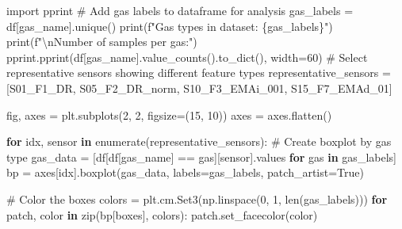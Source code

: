 \documentclass[
  letterpaper,
  DIV=11,
  numbers=noendperiod]{scrartcl}
\newenvironment{Shaded}{\begin{snugshade}}{\end{snugshade}}
\newcommand{\BuiltInTok}[1]{\textcolor[rgb]{0.00,0.23,0.31}{#1}}
\newcommand{\CharTok}[1]{\textcolor[rgb]{0.13,0.47,0.30}{#1}}
\newcommand{\CommentTok}[1]{\textcolor[rgb]{0.37,0.37,0.37}{#1}}
\newcommand{\ControlFlowTok}[1]{\textcolor[rgb]{0.00,0.23,0.31}{\textbf{#1}}}
\newcommand{\DecValTok}[1]{\textcolor[rgb]{0.68,0.00,0.00}{#1}}
\newcommand{\ImportTok}[1]{\textcolor[rgb]{0.00,0.46,0.62}{#1}}
\newcommand{\KeywordTok}[1]{\textcolor[rgb]{0.00,0.23,0.31}{\textbf{#1}}}
\newcommand{\NormalTok}[1]{\textcolor[rgb]{0.00,0.23,0.31}{#1}}
\newcommand{\OperatorTok}[1]{\textcolor[rgb]{0.37,0.37,0.37}{#1}}
\newcommand{\SpecialCharTok}[1]{\textcolor[rgb]{0.37,0.37,0.37}{#1}}
\newcommand{\SpecialStringTok}[1]{\textcolor[rgb]{0.13,0.47,0.30}{#1}}
\newcommand{\StringTok}[1]{\textcolor[rgb]{0.13,0.47,0.30}{#1}}
\newcommand{\VariableTok}[1]{\textcolor[rgb]{0.07,0.07,0.07}{#1}}
\renewenvironment{Shaded}{%
  \begin{tcolorbox}[%
    enhanced,%
    colback=codebg,%
    colframe=codebg,%
    borderline west={3pt}{0pt}{sectionblue},%
    fontupper=\small\ttfamily,%
    boxrule=0pt,%
    arc=0pt,%
    boxsep=5pt,%
    left=2mm,%
    right=2mm,%
    top=2mm,%
    bottom=2mm%
  ]%
}{%
  \end{tcolorbox}%
}
\begin{document}
\begin{Shaded}
\begin{Highlighting}[]
\ImportTok{import}\NormalTok{ pprint}
\CommentTok{\# Add gas labels to dataframe for analysis}
\NormalTok{gas\_labels }\OperatorTok{=}\NormalTok{ df[}\StringTok{\textquotesingle{}gas\_name\textquotesingle{}}\NormalTok{].unique()}
\BuiltInTok{print}\NormalTok{(}\SpecialStringTok{f"Gas types in dataset: }\SpecialCharTok{\{}\NormalTok{gas\_labels}\SpecialCharTok{\}}\SpecialStringTok{"}\NormalTok{)}
\BuiltInTok{print}\NormalTok{(}\SpecialStringTok{f"}\CharTok{\textbackslash{}n}\SpecialStringTok{Number of samples per gas:"}\NormalTok{)}
\NormalTok{pprint.pprint(df[}\StringTok{\textquotesingle{}gas\_name\textquotesingle{}}\NormalTok{].value\_counts().to\_dict(), width}\OperatorTok{=}\DecValTok{60}\NormalTok{)}
\CommentTok{\# Select representative sensors showing different feature types}
\NormalTok{representative\_sensors }\OperatorTok{=}\NormalTok{ [}\StringTok{\textquotesingle{}S01\_F1\_DR\textquotesingle{}}\NormalTok{, }
                          \StringTok{\textquotesingle{}S05\_F2\_DR\_norm\textquotesingle{}}\NormalTok{, }
                          \StringTok{\textquotesingle{}S10\_F3\_EMAi\_001\textquotesingle{}}\NormalTok{, }
                          \StringTok{\textquotesingle{}S15\_F7\_EMAd\_01\textquotesingle{}}\NormalTok{]}

\NormalTok{fig, axes }\OperatorTok{=}\NormalTok{ plt.subplots(}\DecValTok{2}\NormalTok{, }\DecValTok{2}\NormalTok{, figsize}\OperatorTok{=}\NormalTok{(}\DecValTok{15}\NormalTok{, }\DecValTok{10}\NormalTok{))}
\NormalTok{axes }\OperatorTok{=}\NormalTok{ axes.flatten()}

\ControlFlowTok{for}\NormalTok{ idx, sensor }\KeywordTok{in} \BuiltInTok{enumerate}\NormalTok{(representative\_sensors):}
    \CommentTok{\# Create boxplot by gas type}
\NormalTok{    gas\_data }\OperatorTok{=}\NormalTok{ [df[df[}\StringTok{\textquotesingle{}gas\_name\textquotesingle{}}\NormalTok{] }\OperatorTok{==}\NormalTok{ gas][sensor].values }\ControlFlowTok{for}\NormalTok{ gas }\KeywordTok{in}\NormalTok{ gas\_labels]}
\NormalTok{    bp }\OperatorTok{=}\NormalTok{ axes[idx].boxplot(gas\_data, labels}\OperatorTok{=}\NormalTok{gas\_labels, patch\_artist}\OperatorTok{=}\VariableTok{True}\NormalTok{)}
    
    \CommentTok{\# Color the boxes}
\NormalTok{    colors }\OperatorTok{=}\NormalTok{ plt.cm.Set3(np.linspace(}\DecValTok{0}\NormalTok{, }\DecValTok{1}\NormalTok{, }\BuiltInTok{len}\NormalTok{(gas\_labels)))}
    \ControlFlowTok{for}\NormalTok{ patch, color }\KeywordTok{in} \BuiltInTok{zip}\NormalTok{(bp[}\StringTok{\textquotesingle{}boxes\textquotesingle{}}\NormalTok{], colors):}
\NormalTok{        patch.set\_facecolor(color)}
    

\end{Highlighting}
\end{Shaded}
\end{document}
